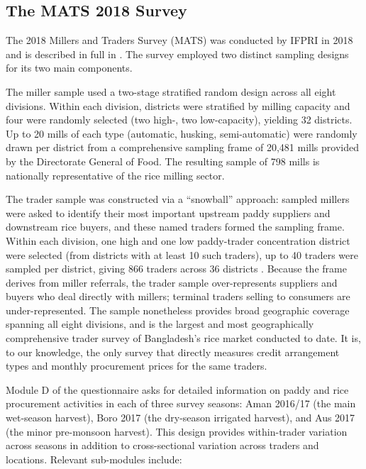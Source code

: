 \documentclass[authoryear,preprint,review,12pt]{elsarticle}
\begin{document}
\subsection{The MATS 2018 Survey}

The 2018 Millers and Traders Survey (MATS) was conducted by IFPRI in 2018
and is described in full in \citet{dorosh_etal2021}. The survey employed
two distinct sampling designs for its two main components.

The miller sample used a two-stage stratified random design across all
eight divisions. Within each division, districts were stratified by milling
capacity and four were randomly selected (two high-, two low-capacity),
yielding 32 districts. Up to 20 mills of each type (automatic, husking,
semi-automatic) were randomly drawn per district from a comprehensive
sampling frame of 20,481 mills provided by the Directorate General of Food.
The resulting sample of 798 mills is nationally representative of the
rice milling sector.

The trader sample was constructed via a ``snowball'' approach: sampled
millers were asked to identify their most important upstream paddy suppliers
and downstream rice buyers, and these named traders formed the sampling
frame. Within each division, one high and one low paddy-trader concentration
district were selected (from districts with at least 10 such traders), up to
40 traders were sampled per district, giving 866 traders across 36 districts
\citep{dorosh_etal2021}. Because the frame derives from miller referrals,
the trader sample over-represents suppliers and buyers who deal directly
with millers; terminal traders selling to consumers are under-represented.
The sample nonetheless provides broad geographic coverage spanning all eight
divisions, and is the largest and most geographically comprehensive trader
survey of Bangladesh's rice market conducted to date. It is, to our
knowledge, the only survey that directly measures credit arrangement types
and monthly procurement prices for the same traders.

Module D of the questionnaire asks for detailed information on paddy and rice
procurement activities in each of three survey seasons: Aman 2016/17 (the
main wet-season harvest), Boro 2017 (the dry-season irrigated harvest), and
Aus 2017 (the minor pre-monsoon harvest). This design provides within-trader
variation across seasons in addition to cross-sectional variation across
traders and locations. Relevant sub-modules include:
\end{document}
